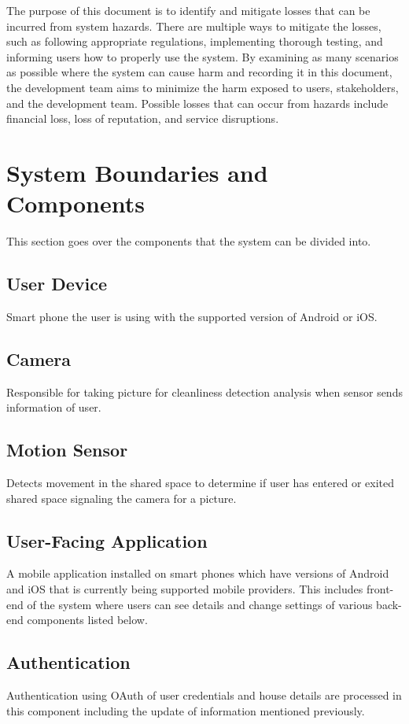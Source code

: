 \documentclass{article}
\begin{document}
The purpose of this document is to identify and mitigate losses that can be incurred from system hazards. There are multiple ways to mitigate the losses, such as following appropriate regulations, implementing thorough testing, and informing users how to properly use the system. By examining as many scenarios as possible where the system can cause harm and recording it in this document, the development team aims to minimize the harm exposed to users, stakeholders, and the development team. Possible losses that can occur from hazards include financial loss, loss of reputation, and service disruptions.      

\section{System Boundaries and Components}
This section goes over the components that the system can be divided into.

\subsection{User Device}
Smart phone the user is using with the supported version of Android or iOS.

\subsection{Camera}
Responsible for taking picture for cleanliness detection analysis when sensor sends information of user.

\subsection{Motion Sensor}
Detects movement in the shared space to determine if user has entered or exited shared space signaling the camera for a picture.

\subsection{User-Facing Application}
A mobile application installed on smart phones which have versions of Android and iOS that is currently being supported mobile providers. This includes front-end of the system where users can see details and change settings of various back-end components listed below.

\subsection{Authentication}
Authentication using OAuth of user credentials and house details are processed in this component including the update of information mentioned previously.
\end{document}
